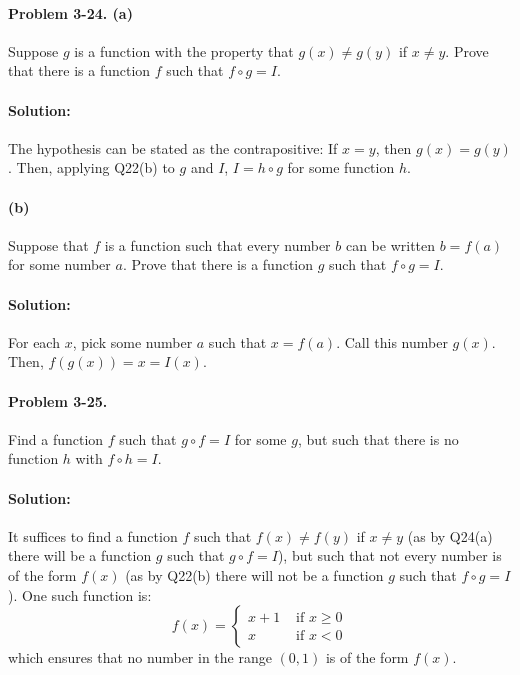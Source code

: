 \documentclass{article}
\begin{document}
\paragraph{Problem 3-24. (a)} Suppose $g$ is a function with the property that
$g(x) \neq g(y)$ if $x \neq y$. Prove that there is a function $f$ such that $f
\circ g = I$.

\paragraph{Solution:} The hypothesis can be stated as the contrapositive: If $x
= y$, then $g(x) = g(y)$. Then, applying Q22(b) to $g$ and $I$, $I = h \circ g$
for some function $h$.

\paragraph{(b)} Suppose that $f$ is a function such that every number $b$ can
be written $b = f(a)$ for some number $a$. Prove that there is a function $g$
such that $f \circ g = I$.

\paragraph{Solution:} For each $x$, pick some number $a$ such that $x = f(a)$.
Call this number $g(x)$. Then, $f(g(x)) = x = I(x)$.

\paragraph{Problem 3-25.} Find a function $f$ such that $g \circ f = I$ for
some $g$, but such that there is no function $h$ with $f \circ h = I$.

\paragraph{Solution:} It suffices to find a function $f$ such that $f(x) \neq
f(y)$ if $x \neq y$ (as by Q24(a) there will be a function $g$ such that $g
\circ f = I$), but such that not every number is of the form $f(x)$ (as by
Q22(b) there will not be a function $g$ such that $f \circ g = I$). One such
function is: \begin{equation*}
  f(x) =
  \begin{cases}
    x + 1 & \text{ if } x \geq 0 \\
    x     & \text{ if } x < 0
  \end{cases}
\end{equation*} which ensures that no number in the range $(0, 1)$ is of the
form $f(x)$.
\end{document}
